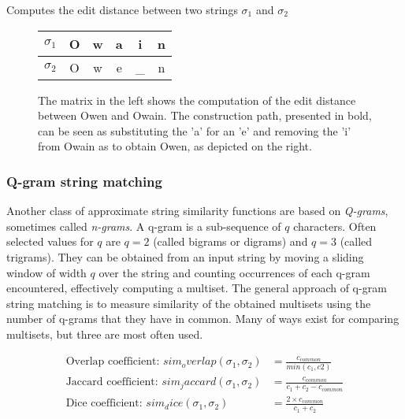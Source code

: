 \documentclass[paper=a4, fontsize=11pt]{scrartcl}
\begin{document}
\begin{algorithm}
    
    \caption{Computes the edit distance between two strings $\sigma_1$ and $\sigma_2$}
    \label{alg:edit_distance}
\end{algorithm}

\begin{figure}
    \centering
    \begin{minipage}{.65\textwidth}
        \centering
        
    \end{minipage}%
    \begin{minipage}{.35\textwidth}
        \centering
        \begin{tabular}{c||c|c|c|c|c}
            $\sigma_1$ & O & w & a & i & n \\\hline
            $\sigma_2$ & O & w & e & \_ & n
        \end{tabular}
    \end{minipage}
    \caption{The matrix in the left shows the computation of the edit distance between Owen and Owain. The construction path, presented in bold, can be seen as substituting the 'a' for an 'e' and removing the 'i' from Owain as to obtain Owen, as depicted on the right.}
    \label{fig:edit_distance}
\end{figure}

\subsubsection{Q-gram string matching}
\label{sec:qgram}
Another class of approximate string similarity functions are based on \emph{Q-grams}, sometimes called \emph{n-grams}.
A q-gram is a sub-sequence of $q$ characters.
Often selected values for $q$ are $q=2$ (called bigrams or digrams) and $q=3$ (called trigrams).
They can be obtained from an input string by moving a sliding window of width $q$ over the string and counting occurrences of each q-gram encountered, effectively computing a multiset.
The general approach of q-gram string matching is to measure similarity of the obtained multisets using the number of q-grams that they have in common.
Many of ways exist for comparing multisets, but three are most often used.

\begin{align}
    \text{Overlap coefficient: }sim_overlap(\sigma_1, \sigma_2) &= \frac{c_{common}}{min(c_1, c2)} \\
    \text{Jaccard coefficient: }sim_jaccard(\sigma_1, \sigma_2) &= \frac{c_{common}}{c_1 + c_2 - c_{common}} \\
    \text{Dice coefficient: }sim_dice(\sigma_1, \sigma_2) &= \frac{2 \times c_{common}}{c_1 + c_2}
\end{align}
\end{document}
